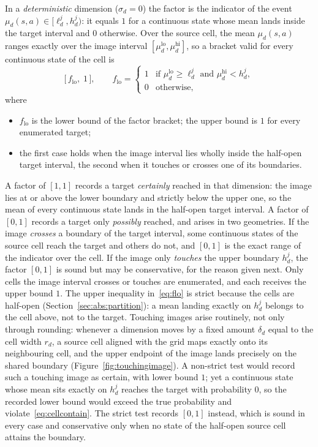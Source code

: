 \documentclass[11pt,a4paper]{article}
\theoremstyle{plain}
\theoremstyle{remark}
\begin{document}
	In a \emph{deterministic} dimension ($\sigma_d = 0$) the factor is
	the indicator of the event $\mu_d(s, a) \in [\ell^j_d, h^j_d)$: it
	equals $1$ for a continuous state whose mean lands inside the target
	interval and $0$ otherwise. Over the source cell, the mean
	$\mu_d(s, a)$ ranges exactly over the image interval
	$[\mu_d^{\text{lo}}, \mu_d^{\text{hi}}]$, so a bracket valid for every continuous state of the cell is
	\begin{equation}
		\bigl[\,f_{\text{lo}},\; 1\,\bigr], \qquad
		f_{\text{lo}} =
		\begin{cases}
			1 & \text{if } \mu_d^{\text{lo}} \ge \ell^j_d \text{ and }
			\mu_d^{\text{hi}} < h^j_d,\\
			0 & \text{otherwise,}
		\end{cases}
		\label{eq:flo}
	\end{equation}
	where
	\begin{itemize}
		\item $f_{\text{lo}}$ is the lower bound of the factor bracket; the
		upper bound is $1$ for every enumerated target;
		\item the first case holds when the image interval lies wholly inside
		the half-open target interval, the second when it touches or crosses
		one of its boundaries.
	\end{itemize}
	
	A factor of $[1,1]$ records a target \emph{certainly} reached in that
	dimension: the image lies at or above the lower boundary and strictly
	below the upper one, so the mean of every continuous state lands in
	the half-open target interval. A factor of $[0,1]$ records a target
	only \emph{possibly} reached, and arises in two geometries. If the
	image \emph{crosses} a boundary of the target interval, some
	continuous states of the source cell reach the target and others do
	not, and $[0,1]$ is the exact range of the indicator over the cell.
	If the image only \emph{touches} the upper boundary $h^j_d$, the
	factor $[0,1]$ is sound but may be conservative, for the reason given
	next. Only cells the image interval crosses or touches are
	enumerated, and each receives the upper bound $1$. The upper
	inequality in~\eqref{eq:flo} is strict because the cells are
	half-open (Section~\ref{sec:abs:partition}): a mean landing exactly
	on $h^j_d$ belongs to the cell above, not to the target. Touching
	images arise routinely, not only through rounding: whenever a
	dimension moves by a fixed amount $\delta_d$ equal to the cell width
	$r_d$, a source cell aligned with the grid maps exactly onto its
	neighbouring cell, and the upper endpoint of the image lands
	precisely on the shared boundary (Figure~\ref{fig:touchingimage}). A
	non-strict test would record such a touching image as certain, with
	lower bound $1$; yet a continuous state whose mean sits exactly on
	$h^j_d$ reaches the target with probability $0$, so the recorded
	lower bound would exceed the true probability and
	violate~\eqref{eq:cellcontain}. The strict test records $[0,1]$
	instead, which is sound in every case and conservative only when no
	state of the half-open source cell attains the boundary.
	
\end{document}
